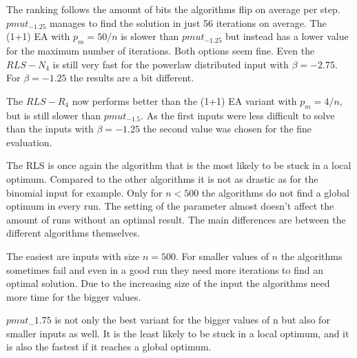 The ranking follows the amount of bits the algorithms flip on average per step.
$pmut_{-1.25}$ manages to find the solution in just 56 iterations on average.
The (1+1) EA with $p_m=50/n$ is slower than $pmut_{-1.25}$ but instead has a lower value for the maximum number of iterations.
Both options seem fine.
Even the $RLS-N_4$ is still very fast for the powerlaw distributed input with $\beta = -2.75$.
For $\beta = -1.25$ the results are a bit different.



The $RLS-R_4$ now performs better than the (1+1) EA variant with $p_m=4/n$, but is still slower than $pmut_{-1.5}$.
As the first inputs were less difficult to solve than the inputs with $\beta = -1.25$ the second value was chosen for the fine evaluation.



The RLS is once again the algorithm that is the most likely to be stuck in a local optimum.
Compared to the other algorithms it is not as drastic as for the binomial input for example.
Only for $n<500$ the algorithms do not find a global optimum in every run.
The setting of the parameter almost doesn't affect the amount of runs without an optimal result.
The main differences are between the different algorithms themselves.



The easiest are inputs with size $n=500$.
For smaller values of $n$ the algorithms sometimes fail and even in a good run they need more iterations to find an optimal solution.
Due to the increasing size of the input the algorithms need more time for the bigger values.



$pmut_-1.75$ is not only the best variant for the bigger values of n but also for smaller inputs as well.
It is the least likely to be stuck in a local optimum, and it is also the fastest if it reaches a global optimum.